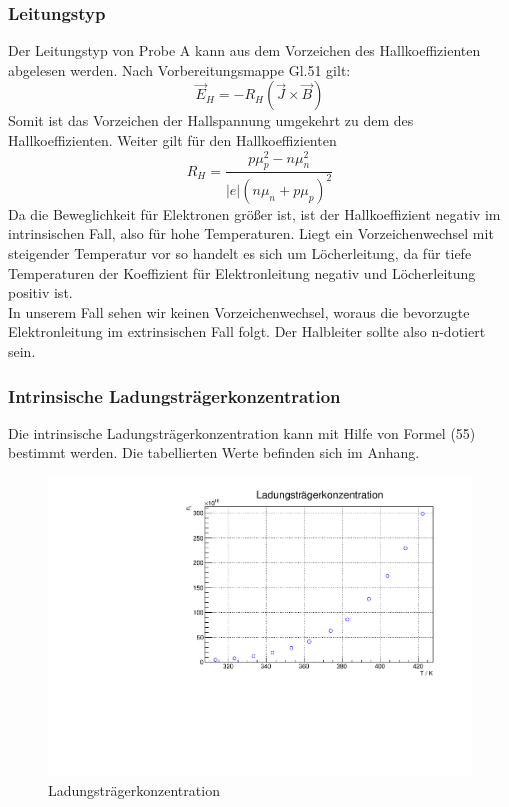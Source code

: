 \FloatBarrier
\subsubsection{Leitungstyp}

Der Leitungstyp von Probe A kann aus dem Vorzeichen des Hallkoeffizienten abgelesen werden. Nach Vorbereitungsmappe Gl.51 gilt:
$$\vec{E}_H = - R_H (\vec{J} \times \vec{B}) $$
Somit ist das Vorzeichen der Hallspannung umgekehrt zu dem des Hallkoeffizienten. Weiter gilt für den Hallkoeffizienten
$$R_H = \frac{p\mu_p^{2} - n \mu _n ^{2}}{\vert e \vert (n \mu _n + p \mu _p)^{2}} $$
Da die Beweglichkeit für Elektronen größer ist, ist der Hallkoeffizient negativ im intrinsischen Fall, also für hohe Temperaturen. Liegt ein Vorzeichenwechsel mit steigender Temperatur vor so handelt es sich um Löcherleitung, da für tiefe Temperaturen der Koeffizient für Elektronleitung negativ und Löcherleitung positiv ist. \\
In unserem Fall sehen wir keinen Vorzeichenwechsel, woraus die bevorzugte Elektronleitung im extrinsischen Fall folgt. Der Halbleiter sollte also n-dotiert sein.

\FloatBarrier
\subsubsection{Intrinsische Ladungsträgerkonzentration}
Die intrinsische Ladungsträgerkonzentration kann mit Hilfe von Formel (55) bestimmt werden. Die tabellierten Werte befinden sich im Anhang.

\begin{figure}
\label{fig:leitin}
\centering
\includegraphics[scale = 0.5]{../data/A4.pdf}
\caption{Ladungsträgerkonzentration}
\end{figure}



